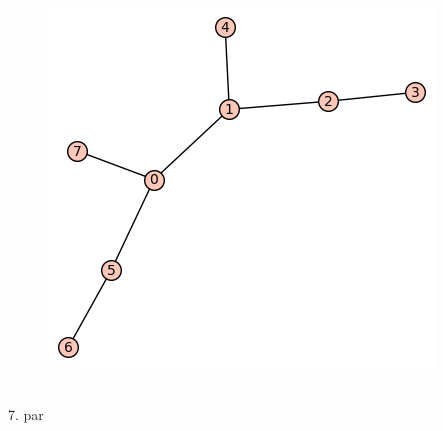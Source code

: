 \documentclass[12pt, a4paper]{article}
\begin{document}
\begin{figure}[h!]
\centering
\includegraphics[width=\linewidth]{t-30}
\end{figure} \\

7. par
\end{document}
